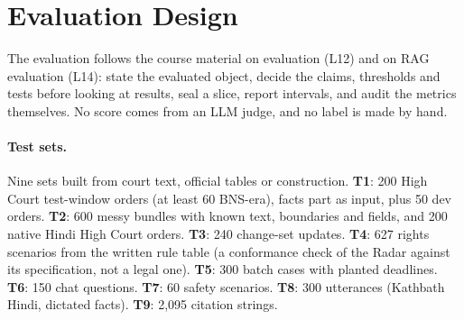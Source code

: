 \section{Evaluation Design}
\label{sec:eval}

The evaluation follows the course material on evaluation (L12) and on RAG evaluation (L14): state the evaluated object, decide the claims, thresholds and tests before looking at results, seal a slice, report intervals, and audit the metrics themselves. No score comes from an LLM judge, and no label is made by hand.

\paragraph{Test sets.} Nine sets built from court text, official tables or construction. \textbf{T1}: 200 High Court test-window orders (at least 60 BNS-era), facts part as input, plus 50 dev orders. \textbf{T2}: 600 messy bundles with known text, boundaries and fields, and 200 native Hindi High Court orders. \textbf{T3}: 240 change-set updates. \textbf{T4}: 627 rights scenarios from the written rule table (a conformance check of the Radar against its specification, not a legal one). \textbf{T5}: 300 batch cases with planted deadlines. \textbf{T6}: 150 chat questions. \textbf{T7}: 60 safety scenarios. \textbf{T8}: 300 utterances (Kathbath Hindi, dictated facts). \textbf{T9}: 2,095 citation strings.

